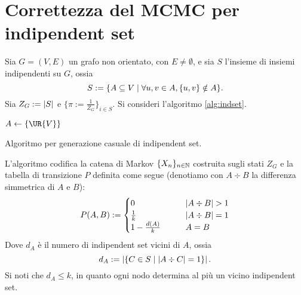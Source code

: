 \section{Correttezza del MCMC per indipendent set}

Sia $G=(V,E)$ un grafo non orientato, con $E\ne\emptyset$, e sia $S$ l'insieme di insiemi indipendenti su $G$, ossia
\begin{equation*}
	S := \{A\subseteq V\mid \forall u,v\in A, \{u,v\}\notin A\} \text.
\end{equation*}
Sia $Z_G:=\left|S\right|$ e $\{\pi:=\frac{1}{Z_G}\}_{i\in S}$. Si consideri l'algoritmo \ref{alg:indset}.

\begin{algorithm}
	\DontPrintSemicolon

	$A\asn\{\UR{V}\}$

	 \;

	\caption{Algoritmo per generazione casuale di indipendent set.}
	\label{alg:indset}
\end{algorithm}

L'algoritmo codifica la catena di Markov $\{X_n\}_{n\in\mathbb N}$ costruita sugli stati $Z_G$ e la tabella di transizione $P$ definita come segue (denotiamo con $A\div B$ la differenza simmetrica di $A$ e $B$):
\begin{equation*}
	P(A,B):=\begin{cases}
		0                  & \qquad \card{A\div B}>1 \\
		\frac 1 k          & \qquad \card{A\div B}=1 \\
		1 - \frac{d(A)}{k} & \qquad A=B
	\end{cases}
\end{equation*}
Dove $d_A$ è il numero di indipendent set vicini di $A$, ossia
\begin{equation*}
	d_A:=\left|\{C\in S\mid \left|A\div C\right|=1\}\right| \text.
\end{equation*}
Si noti che $d_A\le k$, in quanto ogni nodo determina al più un vicino indipendent set.

